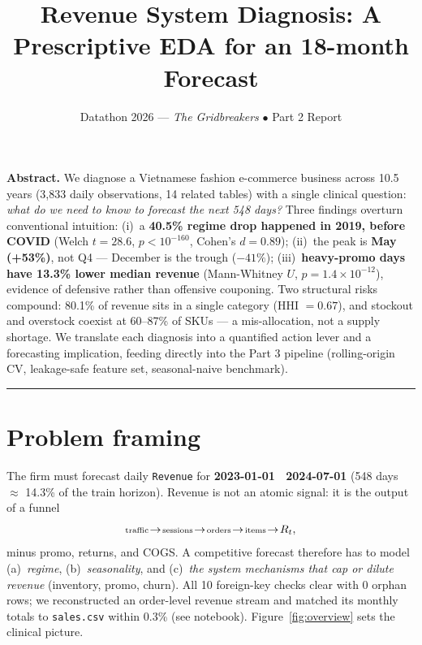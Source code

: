 \documentclass[10pt,a4paper,twocolumn]{article}
\title{\vspace{-2.2em}\textbf{Revenue System Diagnosis: A Prescriptive EDA for an 18-month Forecast}\vspace{-0.5em}}
\author{\small Datathon 2026 --- \textit{The Gridbreakers} \quad $\bullet$ \quad Part 2 Report}
\date{\vspace{-1.6em}}
\newcommand{\keyfact}[1]{\textcolor{accent}{\textbf{#1}}}
\begin{document}
\maketitle
\thispagestyle{empty}

{\small\noindent\textbf{Abstract.} We diagnose a Vietnamese fashion e-commerce business across 10.5 years (3{,}833 daily observations, 14 related tables) with a single clinical question: \emph{what do we need to know to forecast the next 548 days?} Three findings overturn conventional intuition: (i)~a \keyfact{40.5\% regime drop happened in 2019, before COVID} (Welch $t{=}28.6$, $p{<}10^{-160}$, Cohen's $d{=}0.89$); (ii)~the peak is \keyfact{May (+53\%)}, not Q4 --- December is the trough ($-41\%$); (iii)~\keyfact{heavy-promo days have 13.3\% lower median revenue} (Mann-Whitney $U$, $p{=}1.4\times10^{-12}$), evidence of defensive rather than offensive couponing. Two structural risks compound: 80.1\% of revenue sits in a single category (HHI $=0.67$), and stockout and overstock coexist at 60--87\% of SKUs --- a mis-allocation, not a supply shortage. We translate each diagnosis into a quantified action lever and a forecasting implication, feeding directly into the Part 3 pipeline (rolling-origin CV, leakage-safe feature set, seasonal-naive benchmark).}
\vspace{2pt}\hrule\vspace{2pt}

\section{Problem framing}
\label{sec:framing}

The firm must forecast daily \texttt{Revenue} for \textbf{2023-01-01 \textendash\ 2024-07-01} (548 days $\approx$ 14.3\% of the train horizon). Revenue is not an atomic signal: it is the output of a funnel
\[
\text{\scriptsize traffic}\!\to\!\text{\scriptsize sessions}\!\to\!\text{\scriptsize orders}\!\to\!\text{\scriptsize items}\!\to\!R_t,
\]
minus promo, returns, and COGS. A competitive forecast therefore has to model (a)~\emph{regime}, (b)~\emph{seasonality}, and (c)~\emph{the system mechanisms that cap or dilute revenue} (inventory, promo, churn). All 10 foreign-key checks clear with 0 orphan rows; we reconstructed an order-level revenue stream and matched its monthly totals to \texttt{sales.csv} within 0.3\% (see notebook). Figure~\ref{fig:overview} sets the clinical picture.
\end{document}
